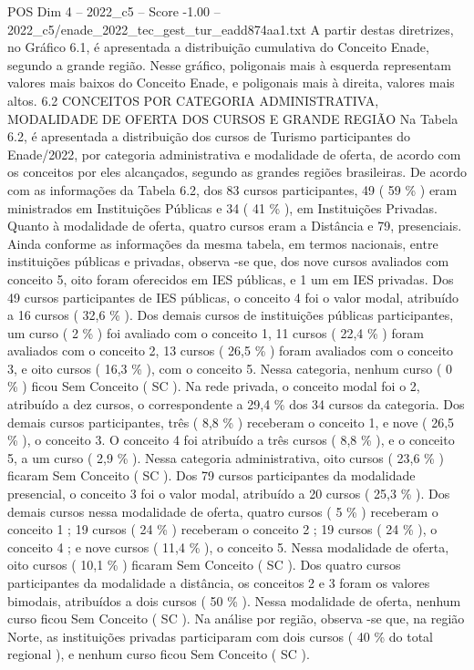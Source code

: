 \begin{textsample}{POS Dim 4 – 2022\_c5 – Score -1.00 – 2022\_c5/enade\_2022\_tec\_gest\_tur\_eadd874aa1.txt}
A partir destas diretrizes, no Gráfico 6.1, é apresentada a distribuição cumulativa do Conceito Enade, segundo a grande região.
Nesse gráfico, poligonais mais à esquerda representam valores mais baixos do Conceito Enade, e poligonais mais à direita, valores mais altos. 6.2 CONCEITOS POR CATEGORIA ADMINISTRATIVA, MODALIDADE DE OFERTA DOS CURSOS E GRANDE REGIÃO Na Tabela 6.2, é apresentada a distribuição dos cursos de Turismo participantes do Enade/2022, por categoria administrativa e modalidade de oferta, de acordo com os conceitos por eles alcançados, segundo as grandes regiões brasileiras.
De acordo com as informações da Tabela 6.2, dos 83 cursos participantes, 49 ( 59 \% ) eram ministrados em Instituições Públicas e 34 ( 41 \% ), em Instituições Privadas.
Quanto à modalidade de oferta, quatro cursos eram a Distância e 79, presenciais.
Ainda conforme as informações da mesma tabela, em termos nacionais, entre instituições públicas e privadas, observa -se que, dos nove cursos avaliados com conceito 5, oito foram oferecidos em IES públicas, e 1 um em IES privadas.
Dos 49 cursos participantes de IES públicas, o conceito 4 foi o valor modal, atribuído a 16 cursos ( 32,6 \% ).
Dos demais cursos de instituições públicas participantes, um curso ( 2 \% ) foi avaliado com o conceito 1, 11 cursos ( 22,4 \% ) foram avaliados com o conceito 2, 13 cursos ( 26,5 \% ) foram avaliados com o conceito 3, e oito cursos ( 16,3 \% ), com o conceito 5.
Nessa categoria, nenhum curso ( 0 \% ) ficou Sem Conceito ( SC ).
Na rede privada, o conceito modal foi o 2, atribuído a dez cursos, o correspondente a 29,4 \% dos 34 cursos da categoria.
Dos demais cursos participantes, três ( 8,8 \% ) receberam o conceito 1, e nove ( 26,5 \% ), o conceito 3.
O conceito 4 foi atribuído a três cursos ( 8,8 \% ), e o conceito 5, a um curso ( 2,9 \% ).
Nessa categoria administrativa, oito cursos ( 23,6 \% ) ficaram Sem Conceito ( SC ).
Dos 79 cursos participantes da modalidade presencial, o conceito 3 foi o valor modal, atribuído a 20 cursos ( 25,3 \% ).
Dos demais cursos nessa modalidade de oferta, quatro cursos ( 5 \% ) receberam o conceito 1 ; 19 cursos ( 24 \% ) receberam o conceito 2 ; 19 cursos ( 24 \% ), o conceito 4 ; e nove cursos ( 11,4 \% ), o conceito 5.
Nessa modalidade de oferta, oito cursos ( 10,1 \% ) ficaram Sem Conceito ( SC ).
Dos quatro cursos participantes da modalidade a distância, os conceitos 2 e 3 foram os valores bimodais, atribuídos a dois cursos ( 50 \% ).
Nessa modalidade de oferta, nenhum curso ficou Sem Conceito ( SC ).
Na análise por região, observa -se que, na região Norte, as instituições privadas participaram com dois cursos ( 40 \% do total regional ), e nenhum curso ficou Sem Conceito ( SC ).

\end{textsample}
